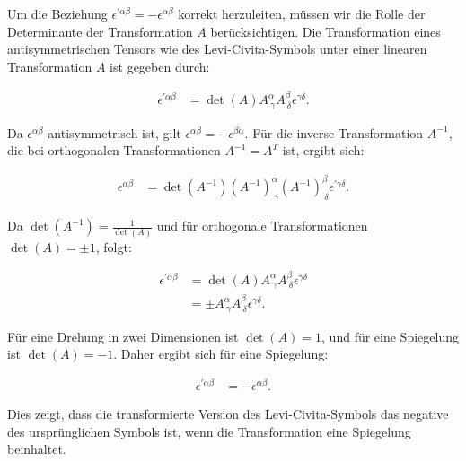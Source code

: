 Um die Beziehung $\epsilon^{\prime \alpha \beta} = -\epsilon^{\alpha \beta}$ korrekt herzuleiten, müssen wir die Rolle der Determinante der Transformation $A$ berücksichtigen. Die Transformation eines antisymmetrischen Tensors wie des Levi-Civita-Symbols unter einer linearen Transformation $A$ ist gegeben durch:

\begin{align*}
\epsilon^{\prime \alpha \beta} &= \det(A) A^\alpha_{\ \gamma} A^\beta_{\ \delta} \epsilon^{\gamma \delta}.
\end{align*}

Da $\epsilon^{\alpha \beta}$ antisymmetrisch ist, gilt $\epsilon^{\alpha \beta} = -\epsilon^{\beta \alpha}$. Für die inverse Transformation $A^{-1}$, die bei orthogonalen Transformationen $A^{-1} = A^T$ ist, ergibt sich:

\begin{align*}
\epsilon^{\alpha \beta} &= \det(A^{-1}) (A^{-1})^\alpha_{\ \gamma} (A^{-1})^\beta_{\ \delta} \epsilon^{\prime \gamma \delta}.
\end{align*}

Da $\det(A^{-1}) = \frac{1}{\det(A)}$ und für orthogonale Transformationen $\det(A) = \pm 1$, folgt:

\begin{align*}
\epsilon^{\prime \alpha \beta} &= \det(A) A^\alpha_{\ \gamma} A^\beta_{\ \delta} \epsilon^{\gamma \delta} \\
&= \pm A^\alpha_{\ \gamma} A^\beta_{\ \delta} \epsilon^{\gamma \delta}.
\end{align*}

Für eine Drehung in zwei Dimensionen ist $\det(A) = 1$, und für eine Spiegelung ist $\det(A) = -1$. Daher ergibt sich für eine Spiegelung:

\begin{align*}
\epsilon^{\prime \alpha \beta} &= -\epsilon^{\alpha \beta}.
\end{align*}

Dies zeigt, dass die transformierte Version des Levi-Civita-Symbols das negative des ursprünglichen Symbols ist, wenn die Transformation eine Spiegelung beinhaltet.

